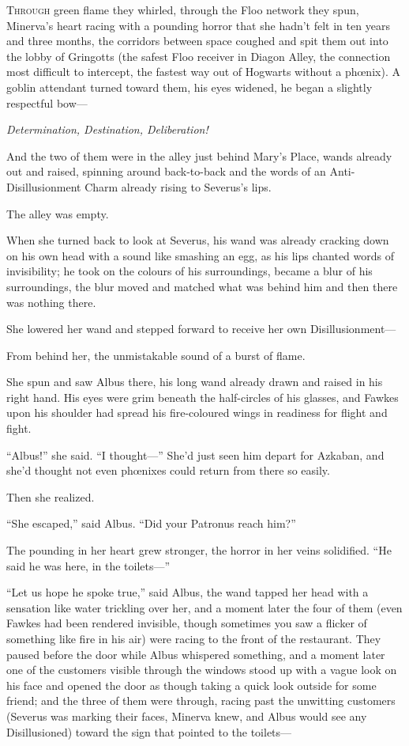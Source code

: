 
\lettrine{T}{hrough} green flame they whirled, through the Floo network they spun, Minerva’s heart racing with a pounding horror that she hadn’t felt in ten years and three months, the corridors between space coughed and spit them out into the lobby of Gringotts (the safest Floo receiver in Diagon Alley, the connection most difficult to intercept, the fastest way out of Hogwarts without a phœnix). A goblin attendant turned toward them, his eyes widened, he began a slightly respectful bow—

\emph{Determination, Destination, Deliberation!}

And the two of them were in the alley just behind Mary’s Place, wands already out and raised, spinning around back-to-back and the words of an Anti-Disillusionment Charm already rising to Severus’s lips.

The alley was empty.

When she turned back to look at Severus, his wand was already cracking down on his own head with a sound like smashing an egg, as his lips chanted words of invisibility; he took on the colours of his surroundings, became a blur of his surroundings, the blur moved and matched what was behind him and then there was nothing there.

She lowered her wand and stepped forward to receive her own Disillusionment—

From behind her, the unmistakable sound of a burst of flame.

She spun and saw Albus there, his long wand already drawn and raised in his right hand. His eyes were grim beneath the half-circles of his glasses, and Fawkes upon his shoulder had spread his fire-coloured wings in readiness for flight and fight.

“Albus!” she said. “I thought—” She’d just seen him depart for Azkaban, and she’d thought not even phœnixes could return from there so easily.

Then she realized.

“She escaped,” said Albus. “Did your Patronus reach him?”

The pounding in her heart grew stronger, the horror in her veins solidified. “He said he was here, in the toilets—”

“Let us hope he spoke true,” said Albus, the wand tapped her head with a sensation like water trickling over her, and a moment later the four of them (even Fawkes had been rendered invisible, though sometimes you saw a flicker of something like fire in his air) were racing to the front of the restaurant. They paused before the door while Albus whispered something, and a moment later one of the customers visible through the windows stood up with a vague look on his face and opened the door as though taking a quick look outside for some friend; and the three of them were through, racing past the unwitting customers (Severus was marking their faces, Minerva knew, and Albus would see any Disillusioned) toward the sign that pointed to the toilets—

